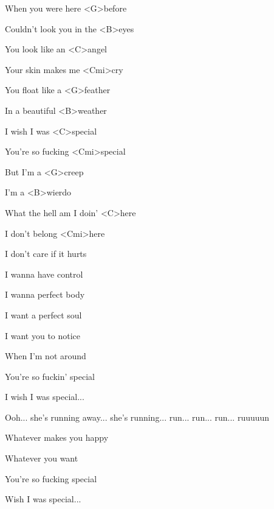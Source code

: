 

\zs 
When you were here <G>before

Couldn't look you in the <B>eyes

You look like an <C>angel

Your skin makes me <Cmi>cry
\ks

\zs
You float like a <G>feather

In a beautiful <B>weather

I wish I was <C>special

You're so fucking <Cmi>special
\ks

\zr
But I'm a <G>creep 

I'm a <B>wierdo

What the hell am I doin' <C>here

I don't belong <Cmi>here
\kr

\zs
I don't care if it hurts

I wanna have control

I wanna perfect body

I want a perfect soul
\ks

\zs
I want you to notice

When I'm not around

You're so fuckin' special

I wish I was special...
\ks

\zr 


Ooh... she's running away... she's running... run... run... run... ruuuuun
\kr

\zs
Whatever makes you happy

Whatever you want

You're so fucking special

Wish I was special...
\ks

\zr \kr

\kp
